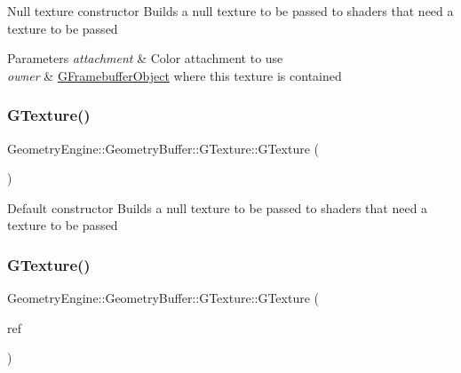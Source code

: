 Null texture constructor Builds a null texture to be passed to shaders that need a texture to be passed 
\begin{DoxyParams}{Parameters}
{\em attachment} & Color attachment to use \\
\hline
{\em owner} & \mbox{\hyperlink{class_geometry_engine_1_1_geometry_buffer_1_1_g_framebuffer_object}{G\+Framebuffer\+Object}} where this texture is contained \\
\hline
\end{DoxyParams}
\mbox{\label{class_geometry_engine_1_1_geometry_buffer_1_1_g_texture_acfb10448d13cf57f11ed8a80b2a620dd}} 
\subsubsection{\texorpdfstring{GTexture()}{GTexture()}\hspace{0.1cm}{\footnotesize\ttfamily [5/6]}}
{\footnotesize\ttfamily Geometry\+Engine\+::\+Geometry\+Buffer\+::\+G\+Texture\+::\+G\+Texture (\begin{DoxyParamCaption}{ }\end{DoxyParamCaption})}

Default constructor Builds a null texture to be passed to shaders that need a texture to be passed \mbox{\label{class_geometry_engine_1_1_geometry_buffer_1_1_g_texture_a6f0f5cdfdad0a20af7719c743375d678}} 
\subsubsection{\texorpdfstring{GTexture()}{GTexture()}\hspace{0.1cm}{\footnotesize\ttfamily [6/6]}}
{\footnotesize\ttfamily Geometry\+Engine\+::\+Geometry\+Buffer\+::\+G\+Texture\+::\+G\+Texture (\begin{DoxyParamCaption}\item[{const \mbox{\hyperlink{class_geometry_engine_1_1_geometry_buffer_1_1_g_texture}{G\+Texture}} \&}]{ref }\end{DoxyParamCaption})}

